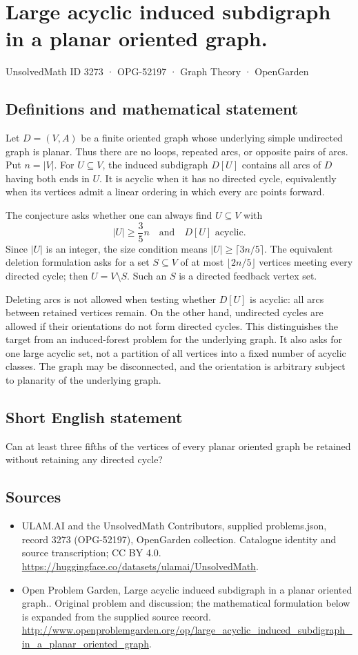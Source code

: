 \documentclass[11pt,a4paper]{article}
\begin{document}
\section*{Large acyclic induced subdigraph in a planar oriented graph.}\label{3273}
{\small UnsolvedMath ID 3273 · OPG-52197 · Graph Theory · OpenGarden}
\subsection{Definitions and mathematical statement}
Let $D=(V,A)$ be a finite oriented graph whose underlying simple
undirected graph is planar. Thus there are no loops, repeated arcs,
or opposite pairs of arcs. Put $n=|V|$. For $U\subseteq V$, the induced
subdigraph $D[U]$ contains all arcs of $D$ having both ends in $U$.
It is acyclic when it has no directed cycle, equivalently when its
vertices admit a linear ordering in which every arc points forward.

The conjecture asks whether one can always find $U\subseteq V$ with
\[
                           |U|\ge\frac35n
                  \quad\text{and}\quad D[U]\text{ acyclic}.
\]
Since $|U|$ is an integer, the size condition means
$|U|\ge\lceil3n/5\rceil$. The equivalent deletion formulation asks for
a set $S\subseteq V$ of at most $\lfloor2n/5\rfloor$ vertices meeting
every directed cycle; then $U=V\setminus S$. Such an $S$ is a directed
feedback vertex set.

Deleting arcs is not allowed when testing whether $D[U]$ is acyclic:
all arcs between retained vertices remain. On the other hand,
undirected cycles are allowed if their orientations do not form
directed cycles. This distinguishes the target from an induced-forest
problem for the underlying graph. It also asks for one large acyclic
set, not a partition of all vertices into a fixed number of acyclic
classes. The graph may be disconnected, and the orientation is arbitrary
subject to planarity of the underlying graph.
\subsection{Short English statement}
Can at least three fifths of the vertices of every planar oriented graph be retained without retaining any directed cycle?
\subsection{Sources}
\begin{itemize}
\item[S1] ULAM.AI and the UnsolvedMath Contributors, supplied problems.json, record 3273 (OPG-52197), OpenGarden collection. Catalogue identity and source transcription; CC BY 4.0.
\url{https://huggingface.co/datasets/ulamai/UnsolvedMath}.
\item[S2] Open Problem Garden, Large acyclic induced subdigraph in a planar oriented graph.. Original problem and discussion; the mathematical formulation below is expanded from the supplied source record.
\url{http://www.openproblemgarden.org/op/large_acyclic_induced_subdigraph_in_a_planar_oriented_graph}.
\end{itemize}
\end{document}
